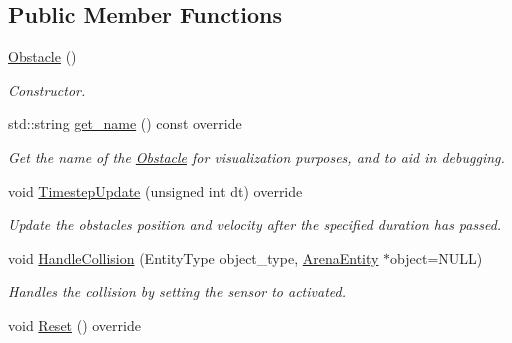 \subsection*{Public Member Functions}
\begin{DoxyCompactItemize}
\item 
\hyperlink{classObstacle_a8f734072321fa06a7b7dae2d5f50f352}{Obstacle} ()\hypertarget{classObstacle_a8f734072321fa06a7b7dae2d5f50f352}{}\label{classObstacle_a8f734072321fa06a7b7dae2d5f50f352}

\begin{DoxyCompactList}\small\item\em Constructor. \end{DoxyCompactList}\item 
std\+::string \hyperlink{classObstacle_a4642d3f61b6e74fd5a9c91bb263dfe18}{get\+\_\+name} () const override\hypertarget{classObstacle_a4642d3f61b6e74fd5a9c91bb263dfe18}{}\label{classObstacle_a4642d3f61b6e74fd5a9c91bb263dfe18}

\begin{DoxyCompactList}\small\item\em Get the name of the \hyperlink{classObstacle}{Obstacle} for visualization purposes, and to aid in debugging. \end{DoxyCompactList}\item 
void \hyperlink{classObstacle_adda549c77a5a67aa5423cb0f84b986df}{Timestep\+Update} (unsigned int dt) override
\begin{DoxyCompactList}\small\item\em Update the obstacle\textquotesingle{}s position and velocity after the specified duration has passed. \end{DoxyCompactList}\item 
void \hyperlink{classObstacle_aa4e6d051a5fe8024d59425737baa381f}{Handle\+Collision} (Entity\+Type object\+\_\+type, \hyperlink{classArenaEntity}{Arena\+Entity} $\ast$object=N\+U\+LL)\hypertarget{classObstacle_aa4e6d051a5fe8024d59425737baa381f}{}\label{classObstacle_aa4e6d051a5fe8024d59425737baa381f}

\begin{DoxyCompactList}\small\item\em Handles the collision by setting the sensor to activated. \end{DoxyCompactList}\item 
void \hyperlink{classObstacle_a5fb8be1be47445fc8286477312b5df62}{Reset} () override\hypertarget{classObstacle_a5fb8be1be47445fc8286477312b5df62}{}\label{classObstacle_a5fb8be1be47445fc8286477312b5df62}


\end{DoxyCompactItemize}
